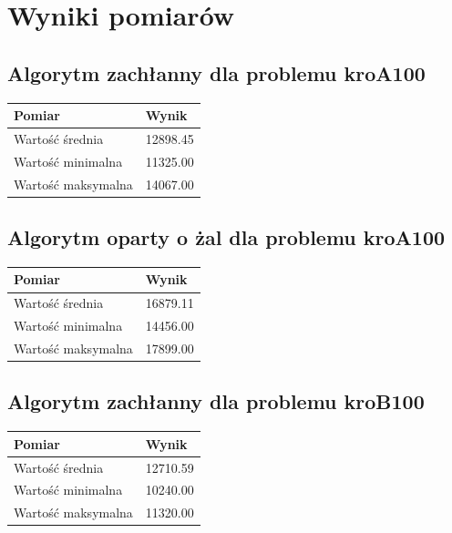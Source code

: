 \documentclass[a4paper]{article}
\begin{document}
\section{Wyniki pomiarów}

\subsection{Algorytm zachłanny dla problemu kroA100}

\begin{center}
	\begin{tabular}{ l | l }
		\textbf{Pomiar} & \textbf{Wynik} \\
		\hline
		Wartość średnia    & 12898.45 \\
		Wartość minimalna  & 11325.00 \\
		Wartość maksymalna & 14067.00 \\
	\end{tabular}
\end{center}

\subsection{Algorytm oparty o żal dla problemu kroA100}

\begin{center}
	\begin{tabular}{ l | l }
		\textbf{Pomiar} & \textbf{Wynik} \\
		\hline
		Wartość średnia    & 16879.11 \\
		Wartość minimalna  & 14456.00 \\
		Wartość maksymalna & 17899.00 \\
	\end{tabular}
\end{center}

\subsection{Algorytm zachłanny dla problemu kroB100}

\begin{center}
	\begin{tabular}{ l | l }
		\textbf{Pomiar} & \textbf{Wynik} \\
		\hline
		Wartość średnia    & 12710.59 \\
		Wartość minimalna  & 10240.00 \\
		Wartość maksymalna & 11320.00 \\
	\end{tabular}
\end{center}
\end{document}

